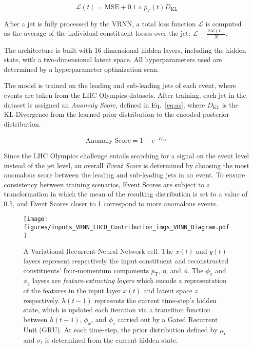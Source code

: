 \documentclass[a4paper,11pt]{article}
\begin{document}
\begin{equation}
\label{eq:lossVAE}
\mathcal{L}(t)=\text{MSE}+0.1 \times \overline{p_T}(t)D_\text{KL}
\end{equation}

After a jet is fully processed by the VRNN, a total loss function $\mathcal{L}$ is computed as the average of the individual constituent losses over the jet: $\mathcal{L} = \frac{\Sigma \mathcal{L}(t)}{N}$.

The architecture is built with 16 dimensional hidden layers, including the hidden state, with a two-dimensional latent space. All hyperparameters used are determined by a hyperparameter optimization scan. 

The model is trained on the leading and sub-leading jets of each event, where events are taken from the LHC Olympics datasets. 
After training, each jet in the dataset is assigned an \textit{Anomaly Score}, defined in Eq.~\ref{eq:as}, where $D_\text{KL}$ is the KL-Divergence from the learned prior distribution to the encoded posterior distribution.

\begin{equation}
\label{eq:as}
\text{Anomaly Score} = 1 - e^{-\overline{D_\text{KL}}}
\end{equation}

Since the LHC Olympics challenge entails searching for a signal on the event level instead of the jet level, an overall \textit{Event Score} is determined by choosing the most anomalous score between the leading and sub-leading jets in an event. 
To ensure consistency between training scenarios, Event Scores are subject to a transformation in which the mean of the resulting distribution is set to a value of 0.5, and Event Scores closer to 1 correspond to more anomalous events. 


\begin{figure}
  \begin{center}
  
\texttt{[image: figures/inputs\_VRNN\_LHCO\_Contribution\_imgs\_VRNN\_Diagram.pdf]}
  
  \end{center}
  \caption{A Variational Recurrent Neural Network cell. The $x(t)$ and $y(t)$ layers represent respectively the input constituent and reconstructed constituents' four-momentum components $p_\text{T}$, $\eta$, and $\phi$. The $\phi_{x}$ and $\phi_{z}$ layers are \textit{feature-extracting layers} which encode a representation of the features in the input layer $x(t)$ and latent space $z$ respectively. $h(t-1)$ represents the current time-step's hidden state, which is updated each iteration via a transition function between $h(t-1)$, $\phi_{x}$, and $\phi_{z}$ carried out by a Gated Recurrent Unit (GRU). At each time-step, the prior distribution defined by $\mu_{t}$ and $\sigma_{t}$ is determined from the current hidden state.}
  \label{fig:VRNN}
\end{figure}
\end{document}
